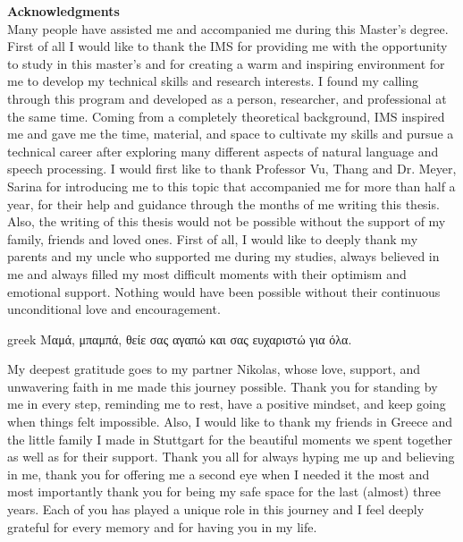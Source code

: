 \documentclass[12pt,leqno,a4paper]{article}
\begin{document}
\newpage
\noindent\textbf{Acknowledgments}\\
\noindent Many people have assisted me and accompanied me during this Master's degree. First of all I would like to thank the IMS for providing me with the opportunity to study in this master's and for creating a warm and inspiring environment for me to develop my technical skills and research interests. I found my calling through this program and developed as a person, researcher, and professional at the same time. Coming from a completely theoretical background, IMS inspired me and gave me the time, material, and space to cultivate my skills and pursue a technical career after exploring many different aspects of natural language and speech processing. I would first like to thank Professor Vu, Thang and Dr. Meyer, Sarina for introducing me to this topic that accompanied me for more than half a year, for their help and guidance through the months of me writing this thesis. Also, the writing of this thesis would not be possible without the support of my family, friends and loved ones. First of all, I would like to deeply thank my parents and my uncle who supported me during my studies, always believed in me and always filled my most difficult moments with their optimism and emotional support. Nothing would have been possible without their continuous unconditional love and encouragement. 

 \begin{otherlanguage}
{greek}
Μαμά, μπαμπά, θείε σας αγαπώ και σας ευχαριστώ για όλα.
\end{otherlanguage}

My deepest gratitude goes to my partner Nikolas, whose love, support, and unwavering faith in me made this journey possible. Thank you for standing by me in every step, reminding me to rest, have a positive mindset, and keep going when things felt impossible.
Also, I would like to thank my friends in Greece and the little family I made in Stuttgart for the beautiful moments we spent together as well as for their support. Thank you all for always hyping me up and believing in me, thank you for offering me a second eye when I needed it the most and most importantly thank you for being my safe space for the last (almost) three years.
Each of you has played a unique role in this journey and I feel deeply grateful for every memory and for having you in my life.

\newpage
\thispagestyle{empty} %
\end{document}
